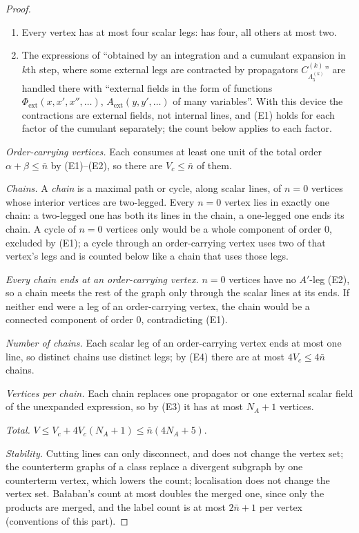 \begin{proof}
\begin{enumerate}[label=\textup{(E\arabic*)},nosep,leftmargin=*]
\item Every vertex has at most four scalar legs: \cite[(1.6)]{Ba3} has four, all others at most two.
\item The expressions of \cite[p.~419]{Ba3} ``obtained by an integration and a cumulant expansion in $k$th step, where some external legs are contracted by propagators $C^{(k)}_{\Lambda^{(k)}_5}$'' are handled there with ``external fields in the form of functions $\Phi_{\mathrm{ext}}(x,x',x'',\dots)$, $A_{\mathrm{ext}}(y,y',\dots)$ of many variables''. With this device the contractions are external fields, not internal lines, and (E1) holds for each factor of the cumulant separately; the count below applies to each factor.
\end{enumerate}
\emph{Order-carrying vertices.} Each consumes at least one unit of the total order $\alpha+\beta\le\bar n$ by (E1)--(E2), so there are $V_c\le\bar n$ of them.

\emph{Chains.} A \emph{chain} is a maximal path or cycle, along scalar lines, of $n=0$ vertices whose interior vertices are two-legged. Every $n=0$ vertex lies in exactly one chain: a two-legged one has both its lines in the chain, a one-legged one ends its chain. A cycle of $n=0$ vertices only would be a whole component of order $0$, excluded by (E1); a cycle through an order-carrying vertex uses two of that vertex's legs and is counted below like a chain that uses those legs.

\emph{Every chain ends at an order-carrying vertex.} $n=0$ vertices have no $A'$-leg (E2), so a chain meets the rest of the graph only through the scalar lines at its ends. If neither end were a leg of an order-carrying vertex, the chain would be a connected component of order $0$, contradicting (E1).

\emph{Number of chains.} Each scalar leg of an order-carrying vertex ends at most one line, so distinct chains use distinct legs; by (E4) there are at most $4V_c\le4\bar n$ chains.

\emph{Vertices per chain.} Each chain replaces one propagator or one external scalar field of the unexpanded expression, so by (E3) it has at most $N_A+1$ vertices.

\emph{Total.} $V\le V_c+4V_c(N_A+1)\le\bar n(4N_A+5)$.

\emph{Stability.} Cutting lines can only disconnect, and does not change the vertex set; the counterterm graphs of a class replace a divergent subgraph by one counterterm vertex, which lowers the count; localisation does not change the vertex set. Ba{\l}aban's count at most doubles the merged one, since only the products \cite[(1.18)]{Ba3} are merged, and the label count is at most $2\bar n+1$ per vertex (conventions of this part).
\end{proof}

